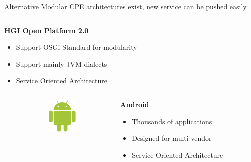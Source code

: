 \documentclass[a4paper]{beamer}
\begin{document}
\begin{frame}{Alternative Modular CPE architectures exist, new service can be pushed easily}
\begin{columns}[T]
																										
		\begin{column}[T]{0.70 \textwidth} 
																																							
																																								   
			\textbf{ HGI Open Platform 2.0}
			\begin{itemize}
				\item Support OSGi Standard for modularity
				\item Support mainly JVM dialects
				\item Service Oriented Architecture
			\end{itemize}
			\vspace{3mm}
																																								     
																																							
		\end{column}
																										
	\end{columns}
						
						
	\begin{columns}[T]
		\begin{column}{.01\textwidth} %
																	
		\end{column}
		\begin{column}[T]{0.15 \textwidth} 
			\vspace{1em}
			\includegraphics[width=4em]{droid.png}
		\end{column}
																						
																										
		\begin{column}[T]{0.70 \textwidth} 
																																							
																																								   
			\textbf{ Android}
			\begin{itemize}
				\item Thousands of applications
				\item Designed for multi-vendor
				\item Service Oriented Architecture
			\end{itemize}
			\vspace{5mm}
																																								     
																																							
		\end{column}
																										
	\end{columns}
							
								
								
								
										
								
									
\end{frame}
\end{document}

